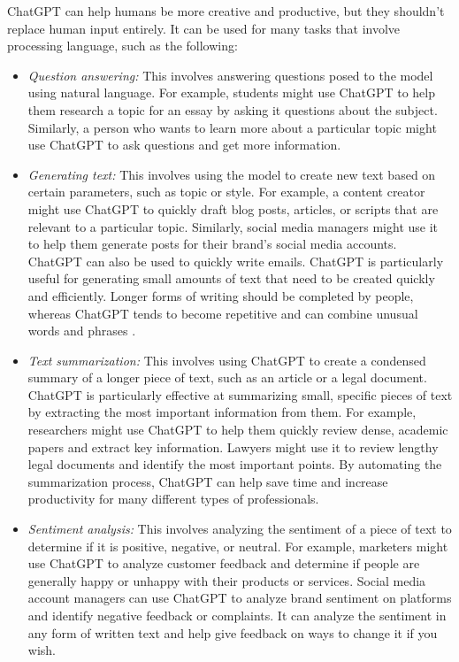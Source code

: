 \documentclass[12pt]{article}
\begin{document}
ChatGPT can help humans be more creative and productive, but they shouldn't replace human input entirely. It can be used for many tasks that involve processing language, such as the following:

\begin{itemize}
    \item \textit{Question answering:} This involves answering questions posed to the model using natural language. For example, students might use ChatGPT to help them research a topic for an essay by asking it questions about the subject. Similarly, a person who wants to learn more about a particular topic might use ChatGPT to ask questions and get more information.
    \item \textit{Generating text:} This involves using the model to create new text based on certain parameters, such as topic or style. For example, a content creator might use ChatGPT to quickly draft blog posts, articles, or scripts that are relevant to a particular topic. Similarly, social media managers might use it to help them generate posts for their brand's social media accounts. ChatGPT can also be used to quickly write emails. ChatGPT is particularly useful for generating small amounts of text that need to be created quickly and efficiently. Longer forms of writing should be completed by people, whereas ChatGPT tends to become repetitive and can combine unusual words and phrases \cite{bushwick_2022}.
    \item \textit{Text summarization:} This involves using ChatGPT to create a condensed summary of a longer piece of text, such as an article or a legal document. ChatGPT is particularly effective at summarizing small, specific pieces of text by extracting the most important information from them. For example, researchers might use ChatGPT to help them quickly review dense, academic papers and extract key information. Lawyers might use it to review lengthy legal documents and identify the most important points. By automating the summarization process, ChatGPT can help save time and increase productivity for many different types of professionals.
    \item \textit{Sentiment analysis:} This involves analyzing the sentiment of a piece of text to determine if it is positive, negative, or neutral. For example, marketers might use ChatGPT to analyze customer feedback and determine if people are generally happy or unhappy with their products or services. Social media account managers can use ChatGPT to analyze brand sentiment on platforms and  identify negative feedback or complaints. It can analyze the sentiment in any form of written text and help give feedback on ways to change it if you wish. 

\end{itemize}
\end{document}
